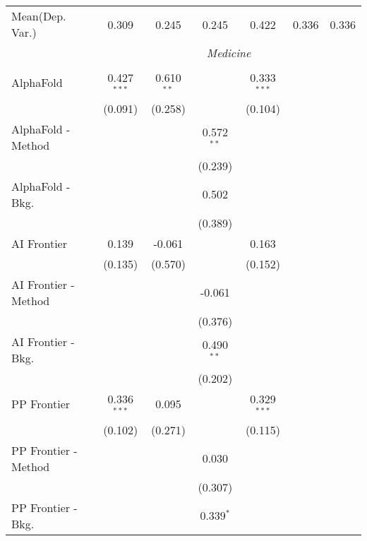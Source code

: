 \begin{tabular}{lcccccc}
Mean(Dep. Var.) & 0.309 & 0.245 & 0.245 & 0.422 & 0.336 & 0.336 \\
 & \multicolumn{6}{c}{\textit{Medicine}} \\ \\
   AlphaFold            & 0.427$^{***}$ & 0.610$^{**}$ &              & 0.333$^{***}$ &        &   \\   
                        & (0.091)       & (0.258)      &              & (0.104)       &        &   \\   
   AlphaFold - Method   &               &              & 0.572$^{**}$ &               &        &   \\   
                        &               &              & (0.239)      &               &        &   \\   
   AlphaFold - Bkg.     &               &              & 0.502        &               &        &   \\   
                        &               &              & (0.389)      &               &        &   \\   
   AI Frontier          & 0.139         & -0.061       &              & 0.163         &        &   \\   
                        & (0.135)       & (0.570)      &              & (0.152)       &        &   \\   
   AI Frontier - Method &               &              & -0.061       &               &        &   \\   
                        &               &              & (0.376)      &               &        &   \\   
   AI Frontier - Bkg.   &               &              & 0.490$^{**}$ &               &        &   \\   
                        &               &              & (0.202)      &               &        &   \\   
   PP Frontier          & 0.336$^{***}$ & 0.095        &              & 0.329$^{***}$ &        &   \\   
                        & (0.102)       & (0.271)      &              & (0.115)       &        &   \\   
   PP Frontier - Method &               &              & 0.030        &               &        &   \\   
                        &               &              & (0.307)      &               &        &   \\   
   PP Frontier - Bkg.   &               &              & 0.339$^{*}$  &               &        &   \\   

\end{tabular}
